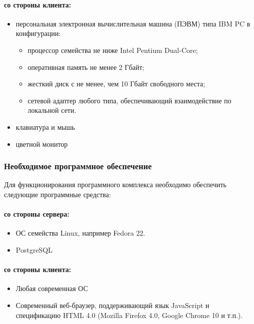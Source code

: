 \paragraph*{со стороны клиента:} \hfill

\begin{itemize}
\item персональная электронная вычислительная машина (ПЭВМ) типа IBM PC в
конфигурации:

\begin{itemize}
\item процессор семейства не ниже Intel Pentium Dual-Core;
\item оперативная память не менее 2 Гбайт;
\item жесткий диск с не менее, чем 10 Гбайт свободного места;
\item сетевой адаптер любого типа, обеспечивающий взаимодействие по локальной сети.
\end{itemize}
\item клавиатура и мышь
\item цветной монитор
\end{itemize}


\subsubsection{Необходимое программное обеспечение}

Для функционирования программного комплекса необходимо обеспечить следующие программные средства: 

\paragraph*{со стороны сервера:} \hfill

\begin{itemize}
\item ОС семейства Linux, например Fedora 22.
\item PostgreSQL
\end{itemize}

\paragraph*{со стороны клиента:} \hfill

\begin{itemize}
\item Любая современная ОС
\item Современный веб-браузер, поддерживающий язык JavaScript и спецификацию HTML 4.0 (Mozilla Firefox 4.0, Google Chrome 10 и т.п.).
\end{itemize}

